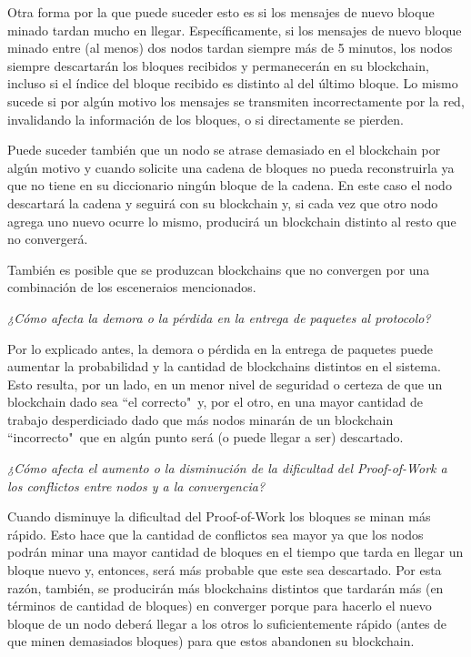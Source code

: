 Otra forma por la que puede suceder esto es si los mensajes de nuevo bloque minado tardan mucho en llegar. Específicamente, si los mensajes de nuevo bloque minado entre (al menos) dos nodos tardan siempre más de 5 minutos, los nodos siempre descartarán los bloques recibidos y permanecerán en su blockchain, incluso si el índice del bloque recibido es distinto al del último bloque. Lo mismo sucede si por algún motivo los mensajes se transmiten incorrectamente por la red, invalidando la información de los bloques, o si directamente se pierden.

Puede suceder también que un nodo se atrase demasiado en el blockchain por algún motivo y cuando solicite una cadena de bloques no pueda reconstruirla ya que no tiene en su diccionario ningún bloque de la cadena. En este caso el nodo descartará la cadena y seguirá con su blockchain y, si cada vez que otro nodo agrega uno nuevo ocurre lo mismo, producirá un blockchain distinto al resto que no convergerá.

También es posible que se produzcan blockchains que no convergen por una combinación de los esceneraios mencionados.

\emph{¿Cómo afecta la demora o la pérdida en la entrega de paquetes al protocolo?}

Por lo explicado antes, la demora o pérdida en la entrega de paquetes puede aumentar la probabilidad y la cantidad de blockchains distintos en el sistema. Esto resulta, por un lado, en un menor nivel de seguridad o certeza de que un blockchain dado sea ``el correcto"\ y, por el otro, en una mayor cantidad de trabajo desperdiciado dado que más nodos minarán de un blockchain ``incorrecto"\ que en algún punto será (o puede llegar a ser) descartado.

\emph{¿Cómo afecta el aumento o la disminución de la dificultad del Proof-of-Work a los conflictos entre nodos y a la convergencia?}

Cuando disminuye la dificultad del Proof-of-Work los bloques se minan más rápido. Esto hace que la cantidad de conflictos sea mayor ya que los nodos podrán minar una mayor cantidad de bloques en el tiempo que tarda en llegar un bloque nuevo y, entonces, será más probable que este sea descartado. Por esta razón, también, se producirán más blockchains distintos que tardarán más (en términos de cantidad de bloques) en converger porque para hacerlo el nuevo bloque de un nodo deberá llegar a los otros lo suficientemente rápido (antes de que minen demasiados bloques) para que estos abandonen su blockchain.

